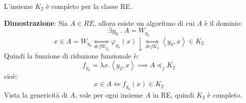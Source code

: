 \documentclass[a4paper]{article}
\begin{document}
\begin{theorem}
  L'insieme \( K_2 \) è completo per la classe RE.

  \vspace{1em}
  \noindent
  \textbf{Dimostrazione}: Sia \( A \in RE \), allora esiste un algoritmo di cui
  \( A \) è il dominio:
  \[
    \exists y_0 \;.\; A = W_{y_0}
  \] 
  \[
    x \in A = W_{y_0} \underset{def W_{y_0}}{\iff} \varphi_{y_0}(x) \downarrow
    \underset{def K_2}{\iff} \left<y_0, x\right> \in K_2
  \] 
  Quindi la funzione di riduzione funzionale è:
  \[
    f_{y_0} = \lambda x. \left<y_0, x\right> \implies A \preceq_f K_2
  \] 
  cioè:
  \[
    x \in A \iff f_{y_0}(x) \in K_2
  \] 
  Vista la genericità di \( A \), vale per ogni insieme \( A \) in RE,
  quindi \( K_2 \) è completo.
\end{theorem}
\vspace{1em}
\noindent
\end{document}
